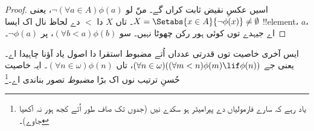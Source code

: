 \documentclass[../../../include/open-logic-section]{subfiles}
\begin{document}
\begin{proof}
اسیں عکسِ نقیض ثابت کراں گے۔ منّ لو $\lnot(\forall a \in A)\phi(a)$، یعنی
$X = \Setabs{x \in A}{\lnot\phi(x)} \neq \emptyset$۔ تاں $X$ دا
$<$ دے لحاظ نال اک ایسا !!{element}، $a$، اے جیہدے توں کوئی ہور رکن چھوٹا نہیں۔ سو
$(\forall b < a)\phi(b)$، پر $\lnot \phi(a)$۔ \end{proof}\noindent
ایس آخری خاصیت توں قدرتی عدداں اُتے مضبوط استقرا دا اصول یاد آؤنا چاہیدا اے۔
یعنی جے $(\forall n \in \omega)((\forall m < n)\phi(m) \lif \phi(n))$،
تاں $(\forall n \in \omega)\phi(n)$۔ ایہ خاصیت حُسنِ ترتیب نوں
اک بڑا \emph{مضبوط} تصور بناندی اے۔\footnote{یاد رہے کہ سارے فارمولیاں دے
پیرامیٹر ہو سکدے نیں (جدوں تک صاف طور اُتے کجھ ہور نہ آکھیا جاوے)۔}
\end{document}
